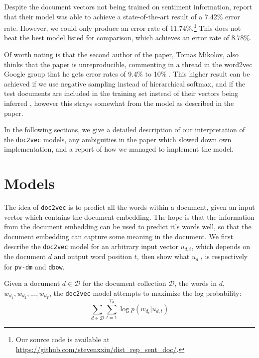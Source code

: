 \documentclass{article}
\begin{document}
Despite the document vectors not being trained on sentiment information, \cite{le_distributed_2014} report that their model was able to achieve a state-of-the-art result of a 7.42\% error rate. However, we could only produce an error rate of 11.74\%.\footnote{Our source code is available at \url{https://github.com/stevenxxiu/dist_rep_sent_doc/}.} This does not beat the best model listed for comparison, which achieves an error rate of 8.78\%.

Of worth noting is that the second author of the paper, Tomas Mikolov, also thinks that the paper is unreproducible, commenting in a thread in the word2vec Google group that he gets error rates of 9.4\% to 10\% \cite{mikolov_distributed_2014} . This higher result can be achieved if we use negative sampling instead of hierarchical softmax, and if the test documents are included in the training set instead of their vectors being inferred \citep{mohr_gensim_2017}, however this strays somewhat from the model as described in the paper.

In the following sections, we give a detailed description of our interpretation of the \texttt{doc2vec} models, any ambiguities in the paper which slowed down own implementation, and a report of how we managed to implement the model.

\section{Models}
The idea of \texttt{doc2vec} is to predict all the words within a document, given an input vector which contains the document embedding. The hope is that the information from the document embedding can be used to predict it's words well, so that the document embedding can capture some meaning in the document. We first describe the \texttt{doc2vec} model for an arbitrary input vector $u_{d,t}$, which depends on the document $d$ and output word position $t$, then show what $u_{d,t}$ is respectively for \texttt{pv-dm} and \texttt{dbow}.

Given a document $d\in\mathcal{D}$ for the document collection $\mathcal{D}$, the words in $d$, $w_{d_1},w_{d_2},...,w_{d_T}$, the \texttt{doc2vec} model attempts to maximize the log probability:
    \[\sum_{d\in\mathcal{D}}\sum_{t=1}^{T_d} \log p(w_{d_t}|u_{d,t})\]
\end{document}

